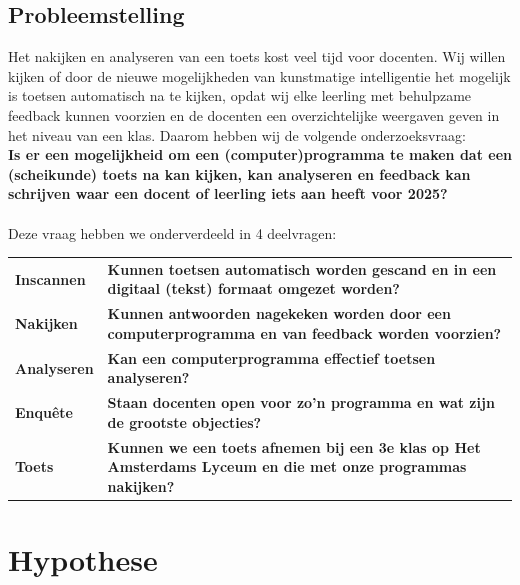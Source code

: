 \documentclass[12pt]{article}
\begin{document}
\begin{multicols}{2}
\subsection{Probleemstelling}
Het nakijken en analyseren van een toets kost veel tijd voor docenten. Wij willen kijken of door de nieuwe mogelijkheden van kunstmatige intelligentie het mogelijk is toetsen automatisch na te kijken, opdat wij elke leerling met behulpzame feedback kunnen voorzien en de docenten een overzichtelijke weergaven geven in het niveau van een klas.
Daarom hebben wij de volgende onderzoeksvraag: \\ %
\textbf{Is er een mogelijkheid om een (computer)programma te maken dat een (scheikunde) toets na kan kijken, kan analyseren en feedback kan schrijven waar een docent of leerling iets aan heeft voor 2025?}
\\\\
Deze vraag hebben we onderverdeeld in 4 deelvragen:\\
\begin{tabularx}{\linewidth}{@{}lX}
    \vspace{0.2cm}
   \textbf{Inscannen } & \textbf{Kunnen toetsen automatisch worden gescand en in een digitaal (tekst) formaat omgezet worden?} \\
   \vspace{0.2cm}
   \textbf{Nakijken } & \textbf{Kunnen antwoorden nagekeken worden door een computerprogramma en van feedback worden voorzien?} \\
   \vspace{0.2cm}
   \textbf{Analyseren } & \textbf{Kan een computerprogramma effectief toetsen analyseren?} \\
   \vspace{0.2cm}
   \textbf{Enquête } & \textbf{Staan docenten open voor zo'n programma en wat zijn de grootste objecties? } \\
   \vspace{0.2cm}
   \textbf{Toets } & \textbf{Kunnen we een toets afnemen bij een 3e klas op Het Amsterdams Lyceum en die met onze programmas nakijken? } \\
\end{tabularx}

\end{multicols}
\pagebreak

\section{Hypothese}
\end{document}
